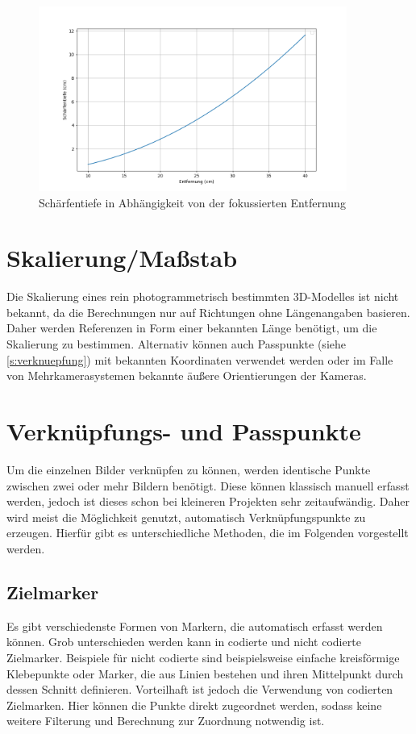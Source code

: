 \documentclass[./00PhotoBox.tex]{subfiles}
\begin{document}
\begin{figure}
    \centering
    \includegraphics[width=0.9\textwidth]{./img/schaerfentiefe_plot.png}
    \caption{Schärfentiefe in Abhängigkeit von der fokussierten Entfernung} %
    \label{img:sschaerfentiefe_plot} %
\end{figure}


\section{Skalierung/Maßstab}
\label{sec:massstab}
Die Skalierung eines rein photogrammetrisch bestimmten 3D-Modelles ist nicht bekannt, da die Berechnungen nur auf Richtungen ohne Längenangaben basieren. Daher werden Referenzen in Form einer bekannten Länge benötigt, um die Skalierung zu bestimmen. Alternativ können auch Passpunkte (siehe \autoref{s:verknuepfung}) mit bekannten Koordinaten verwendet werden oder im Falle von Mehrkamerasystemen bekannte äußere Orientierungen der Kameras. \citep[S. 546]{luhmann}


\section{Verknüpfungs- und Passpunkte}
\label{s:verknuepfung}
Um die einzelnen Bilder verknüpfen zu können, werden identische Punkte zwischen zwei oder mehr Bildern benötigt. Diese können klassisch manuell erfasst werden, jedoch ist dieses schon bei kleineren Projekten sehr zeitaufwändig. Daher wird meist die Möglichkeit genutzt, automatisch Verknüpfungspunkte zu erzeugen. Hierfür gibt es unterschiedliche Methoden, die im Folgenden vorgestellt werden.


\subsection{Zielmarker}
Es gibt verschiedenste Formen von Markern, die automatisch erfasst werden können. Grob unterschieden werden kann in codierte und nicht codierte Zielmarker. Beispiele für nicht codierte sind beispielsweise einfache kreisförmige Klebepunkte oder Marker, die aus Linien bestehen und ihren Mittelpunkt durch dessen Schnitt definieren.
Vorteilhaft ist jedoch die Verwendung von codierten Zielmarken. Hier können die Punkte direkt zugeordnet werden, sodass keine weitere Filterung und Berechnung zur Zuordnung notwendig ist. \citep[S.535ff]{luhmann}
\end{document}
